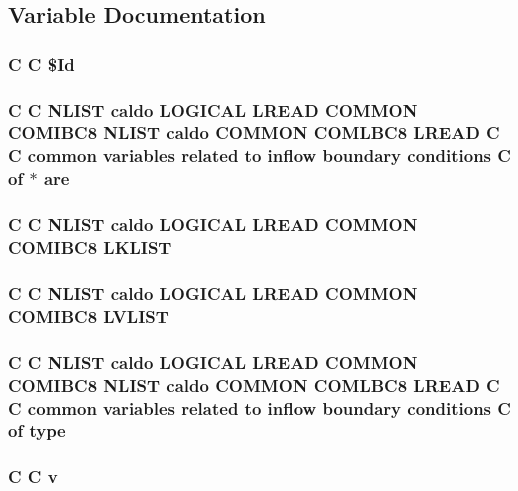 \subsection{Variable Documentation}
\hypertarget{ibc8_8com_af40bd3a96fc1553c00422342f92046b8}{
\subsubsection[{\$\-Id}]{\setlength{\rightskip}{0pt plus 5cm}C C \$Id}}\label{ibc8_8com_af40bd3a96fc1553c00422342f92046b8}
\hypertarget{ibc8_8com_a7f7721a0bb3c1d35cfbfbcfd6efc1548}{
\subsubsection[{are}]{\setlength{\rightskip}{0pt plus 5cm}C C N\-L\-I\-S\-T caldo L\-O\-G\-I\-C\-A\-L {\bf L\-R\-E\-A\-D} C\-O\-M\-M\-O\-N C\-O\-M\-I\-B\-C8 N\-L\-I\-S\-T caldo C\-O\-M\-M\-O\-N C\-O\-M\-L\-B\-C8 {\bf L\-R\-E\-A\-D} C C common variables related to inflow boundary conditions C of $\ast$ are}}\label{ibc8_8com_a7f7721a0bb3c1d35cfbfbcfd6efc1548}
\hypertarget{ibc8_8com_ad61abb12bb3aea850116ed8eb2156f2b}{
\subsubsection[{L\-K\-L\-I\-S\-T}]{\setlength{\rightskip}{0pt plus 5cm}C C N\-L\-I\-S\-T caldo L\-O\-G\-I\-C\-A\-L {\bf L\-R\-E\-A\-D} C\-O\-M\-M\-O\-N C\-O\-M\-I\-B\-C8 L\-K\-L\-I\-S\-T}}\label{ibc8_8com_ad61abb12bb3aea850116ed8eb2156f2b}
\hypertarget{ibc8_8com_aa711cf0c6b8e59731943e29410730275}{
\subsubsection[{L\-V\-L\-I\-S\-T}]{\setlength{\rightskip}{0pt plus 5cm}C C N\-L\-I\-S\-T caldo L\-O\-G\-I\-C\-A\-L {\bf L\-R\-E\-A\-D} C\-O\-M\-M\-O\-N C\-O\-M\-I\-B\-C8 L\-V\-L\-I\-S\-T}}\label{ibc8_8com_aa711cf0c6b8e59731943e29410730275}
\hypertarget{ibc8_8com_a631c5c1ddd478437aa8e7f1d42a3b59d}{
\subsubsection[{type}]{\setlength{\rightskip}{0pt plus 5cm}C C N\-L\-I\-S\-T caldo L\-O\-G\-I\-C\-A\-L {\bf L\-R\-E\-A\-D} C\-O\-M\-M\-O\-N C\-O\-M\-I\-B\-C8 N\-L\-I\-S\-T caldo C\-O\-M\-M\-O\-N C\-O\-M\-L\-B\-C8 {\bf L\-R\-E\-A\-D} C C common variables related to inflow boundary conditions C of type}}\label{ibc8_8com_a631c5c1ddd478437aa8e7f1d42a3b59d}
\hypertarget{ibc8_8com_a8961853e9a171af64fe80e35da93a2e0}{
\subsubsection[{v}]{\setlength{\rightskip}{0pt plus 5cm}C C v}}\label{ibc8_8com_a8961853e9a171af64fe80e35da93a2e0}
